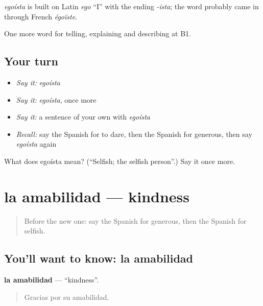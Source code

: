 \begin{cousinweb}
\emph{egoísta} is built on Latin \emph{ego} \textquotedblleft{}I\textquotedblright{} with the ending \emph{-ista}; the word probably came in through French \emph{égoïste}.
\end{cousinweb}

\begin{grammarlens}[title={What you've built}]
One more word for telling, explaining and describing at B1.
\end{grammarlens}

\subsection*{Your turn}
\begin{itemize}
\raggedright
  \item \emph{Say it:} \emph{egoísta}
  \item \emph{Say it:} \emph{egoísta}, once more
  \item \emph{Say it:} a sentence of your own with \emph{egoísta}
  \item \emph{Recall:} say the Spanish for to dare, then the Spanish for generous, then say \emph{egoísta} again
\end{itemize}

\begin{tcolorbox}[breakable,colback=teal!4,colframe=teal!35!black,title={Before you move on}]
What does egoísta mean? (\textquotedblleft{}Selfish; the selfish person\textquotedblright{}.) Say it once more.
\end{tcolorbox}
\section[la amabilidad]{la amabilidad — kindness}

\label{lesson:ES-C723-amabilidad}



\begin{quote}
Before the new one: say the Spanish for generous, then the Spanish for selfish.
\end{quote}

\subsection*{You'll want to know: la amabilidad}
\textbf{la amabilidad} — \textquotedblleft{}kindness\textquotedblright{}.

\begin{quote}
Gracias por su amabilidad.
\end{quote}

